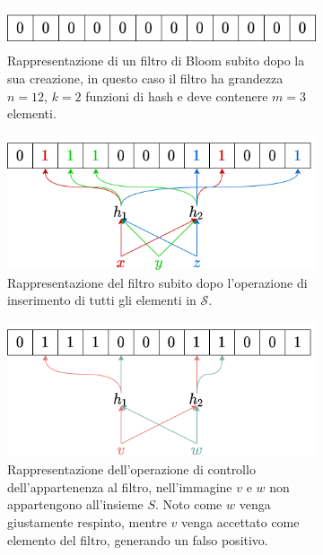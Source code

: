 \documentclass[../../main.tex]{subfiles}
\begin{document}
\begin{figure}[H]
    \centering
    \begin{subfigure}[b]{0.70\textwidth}
       \includegraphics[width=1\linewidth]{immagini/3/bloomFilterInitial .png}
       \caption{Rappresentazione di un filtro di Bloom subito dopo la sua creazione, in questo caso il filtro ha grandezza $n = 12$, $k = 2$ funzioni di hash e deve contenere $m = 3$ elementi.}
       \label{fig:BFCreazione} 
    \end{subfigure}
    
    \begin{subfigure}[b]{0.70\textwidth}
       \includegraphics[width=1\linewidth]{immagini/3/bloomFilterInserimento.png}
       \caption{Rappresentazione del filtro subito dopo l'operazione di inserimento di tutti gli elementi in $\mathcal{S}$.}
       \label{fig:BF:Inizializzazione}
    \end{subfigure}
 
    \begin{subfigure}[b]{0.70\textwidth}
        \includegraphics[width=1\linewidth]{immagini/3/bloomFilterCheck.png}
        \caption{Rappresentazione dell'operazione di controllo dell'appartenenza al filtro, nell'immagine $v$ e $w$ non appartengono all'insieme $S$. Noto come $w$ venga giustamente respinto, mentre $v$ venga accettato come elemento del filtro, generando un falso positivo.}
        \label{fig:BFAppartenenza}
     \end{subfigure}
    \caption{}
    \label{fig:BFExample}
\end{figure}
\end{document}
